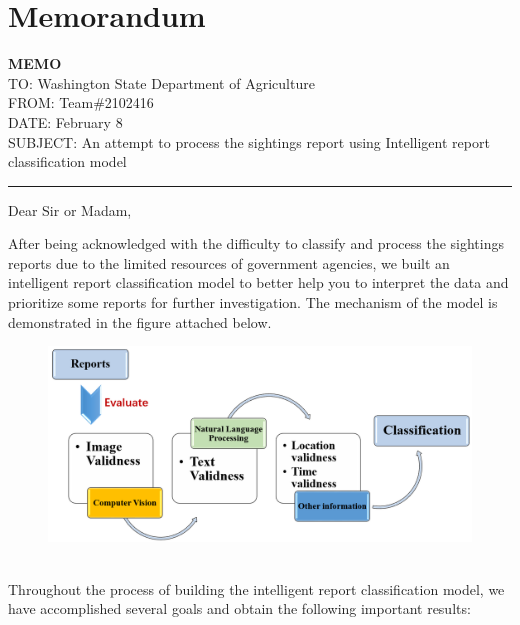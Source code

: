 \documentclass{mcmthesis}
\begin{document}
\section{Memorandum}
	\textbf{MEMO}\\
	TO: Washington State Department of Agriculture\\
	FROM: Team\#2102416 \\
	DATE: February 8\\
	SUBJECT: An attempt to process the sightings report using Intelligent report classification model\\
	\hrule
	\begin{flushleft}
		Dear Sir or Madam,
	\end{flushleft}
	\quad After being acknowledged with the difficulty to classify and process the sightings reports due to the limited resources of government agencies, we built an intelligent report classification model to better help you to interpret the data and prioritize some reports for further investigation. The mechanism of the model is demonstrated in the figure attached below.
	\begin{figure}[h]
		\centering
		\includegraphics[scale=0.5]{procedure.png}
	\end{figure}\\
	Throughout the process of building the intelligent report classification model, we have accomplished several goals and obtain the following important results:
\end{document}
